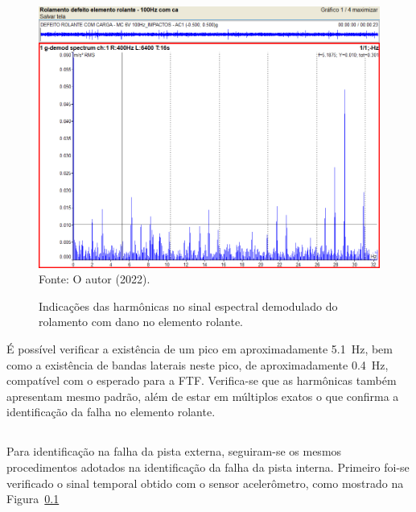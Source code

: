 \documentclass[
	12pt,				
	oneside,			
	a4paper,			
	english,			
	brazil,			
	]{abntex2ppgsi}
\begin{document}
\begin{figure}[H]
\centering
\caption {Indicações das harmônicas no sinal espectral demodulado do rolamento com dano no elemento rolante.}
\includegraphics[width=\textwidth,keepaspectratio]{DANO_ROLANTE_100HZ_HARMONICOS_2BSF} \\
Fonte: O autor (2022).
\label{DANO_ROLANTE_100HZ_HARMONICOS_2BSF}
\end{figure}

É possível verificar a existência de um pico em aproximadamente \SI{5,1}{\hertz}, bem como a existência de bandas laterais neste pico, de aproximadamente \SI{0,4}{\hertz}, compatível com o esperado para a FTF. Verifica-se que as harmônicas também apresentam mesmo padrão, além de estar em múltiplos exatos o que confirma a identificação da falha no elemento rolante.

\subsection{}

Para identificação na falha da pista externa, seguiram-se os mesmos procedimentos adotados na identificação da falha da pista interna. Primeiro foi-se verificado o sinal temporal obtido com o sensor acelerômetro, como mostrado na Figura~\ref{}
\end{document}

